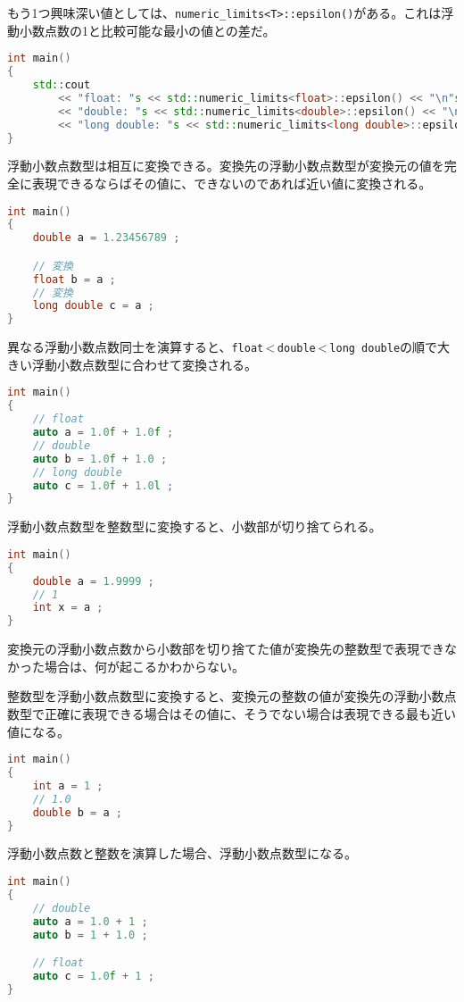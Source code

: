 もう1つ興味深い値としては、\texttt{numeric\_limits<T>::epsilon()}がある。これは浮動小数点数の1と比較可能な最小の値との差だ。

\begin{lstlisting}[language={C++}]
int main()
{
    std::cout
        << "float: "s << std::numeric_limits<float>::epsilon() << "\n"s
        << "double: "s << std::numeric_limits<double>::epsilon() << "\n"s
        << "long double: "s << std::numeric_limits<long double>::epsilon() << "\n"s ;
}
\end{lstlisting}


浮動小数点数型は相互に変換できる。変換先の浮動小数点数型が変換元の値を完全に表現できるならばその値に、できないのであれば近い値に変換される。

\begin{lstlisting}[language={C++}]
int main()
{
    double a = 1.23456789 ;

    // 変換
    float b = a ;
    // 変換
    long double c = a ;
}
\end{lstlisting}

異なる浮動小数点数同士を演算すると、\texttt{float}\,\textless{}\,\texttt{double}\,\textless{}\,\texttt{long double}の順で大きい浮動小数点数型に合わせて変換される。

\ifTombow\pagebreak\fi
\begin{lstlisting}[language={C++}]
int main()
{
    // float
    auto a = 1.0f + 1.0f ;
    // double
    auto b = 1.0f + 1.0 ;
    // long double
    auto c = 1.0f + 1.0l ;
}
\end{lstlisting}


浮動小数点数型を整数型に変換すると、小数部が切り捨てられる。

\begin{lstlisting}[language={C++}]
int main()
{
    double a = 1.9999 ;
    // 1
    int x = a ;
}
\end{lstlisting}

変換元の浮動小数点数から小数部を切り捨てた値が変換先の整数型で表現できなかった場合は、何が起こるかわからない。

整数型を浮動小数点数型に変換すると、変換元の整数の値が変換先の浮動小数点数型で正確に表現できる場合はその値に、そうでない場合は表現できる最も近い値になる。

\begin{lstlisting}[language={C++}]
int main()
{
    int a = 1 ;
    // 1.0
    double b = a ;
}
\end{lstlisting}

浮動小数点数と整数を演算した場合、浮動小数点数型になる。

\ifTombow\enlargethispage{5mm}\fi
\begin{lstlisting}[language={C++}]
int main()
{
    // double
    auto a = 1.0 + 1 ;
    auto b = 1 + 1.0 ;

    // float
    auto c = 1.0f + 1 ;
}
\end{lstlisting}

